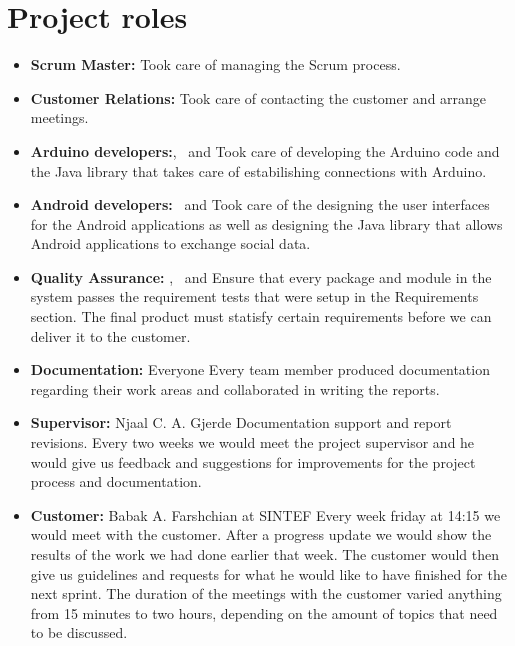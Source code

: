 \section{Project roles}
\begin{itemize}
	\item \textbf{Scrum Master:} \henrik\newline
		Took care of managing the Scrum process.
	
	\item \textbf{Customer Relations:} \henrik\newline
		Took care of contacting the customer and arrange meetings.

	\item \textbf{Arduino developers:}\anders, \bjornar ~and \johan\newline
		Took care of developing the Arduino code and the Java library that takes
		care of estabilishing connections with Arduino.

	\item \textbf{Android developers:}  \emanuele~and \henrik\newline
		Took care of the designing the user interfaces for the Android applications
		as well as designing the Java library that allows Android applications
		to exchange social data.
	
	\item \textbf{Quality Assurance:} \johan, \asbjorn~and \jonas\newline
		Ensure that every package and module in the system passes the requirement tests
		that were setup in the Requirements section. The final product must statisfy certain
		requirements before we can deliver it to the customer.

	\item \textbf{Documentation:} Everyone\newline
		Every team member produced documentation regarding their work areas and
		collaborated in writing the reports.

	\item \textbf{Supervisor:} Njaal C. A. Gjerde\newline
		Documentation support and report revisions. Every two weeks we would meet the project supervisor
	 	and he would give us feedback and suggestions for improvements for the project process and documentation.

	\item \textbf{Customer:} Babak A. Farshchian at SINTEF \newline
		Every week friday at 14:15 we would meet with the customer. After a progress update we would show the results
		of the work we had done earlier that week. The customer would then give us guidelines and requests for what
		he would like to have finished for the next sprint. The duration of the meetings with the customer varied anything
		from 15 minutes to two hours, depending on the amount of topics that need to be discussed.
\end{itemize}

